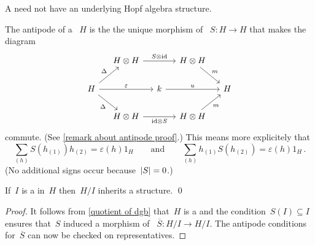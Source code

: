 \documentclass[a4paper,10pt,headings=standardclasses]{scrartcl}
\begin{document}
\begin{warning}
  A {\dgh} need not have an underlying Hopf algebra structure.
\end{warning}

\begin{remark}
  \label{remark about antipode}
  The antipode of a {\dgh}~$H$ is the the unique morphism of {\dgvs}~$S \colon H \to H$ that makes the diagram
  \begin{equation}
    \label{antipode diagram}
    \begin{tikzcd}[column sep = small]
      {}
      &
      H \tensor H
      \arrow{rr}[above]{S \tensor {\id}}
      &
      {}
      &
      H \tensor H
      \arrow{dr}[above right]{m}
      &
      {}
      \\
      H
      \arrow{ur}[above left]{\Delta}
      \arrow{rr}[above]{\varepsilon}
      \arrow{dr}[below left]{\Delta}
      &
      {}
      &
      k
      \arrow{rr}[above]{u}
      &
      {}
      &
      H
      \\
      {}
      &
      H \tensor H
      \arrow{rr}[below]{{\id} \tensor S}
      &
      {}
      &
      H \tensor H
      \arrow{ur}[below right]{m}
      &
      {}
    \end{tikzcd}
  \end{equation}
  commute.
  (See \cref{remark about antipode proof}.)
  This means more explicitely that
  \[
    \sum_{(h)} S(h_{(1)}) h_{(2)}
    =
    \varepsilon(h) 1_H
    \qquad\text{and}\qquad
    \sum_{(h)} h_{(1)} S(h_{(2)})
    =
    \varepsilon(h) 1_H  \,.
  \]
  (No additional signs occur because~$\lvert S\rvert = 0$.)
\end{remark}

\begin{lemma}
  If~$I$ is a {\dghi} in~$H$ then~$H/I$ inherits a {\dgh} structure.
  \qed
\end{lemma}

\begin{proof}
  It follows from \cref{quotient of dgb} that~$H$ is a {\dgb} and the condition~$S(I) \subseteq I$ ensures that~$S$ induced a morphism of {\dgvs}~$\overline{S} \colon H/I \to H/I$.
  The antipode conditions for~$\overline{S}$ can now be checked on representatives.
\end{proof}
\end{document}
